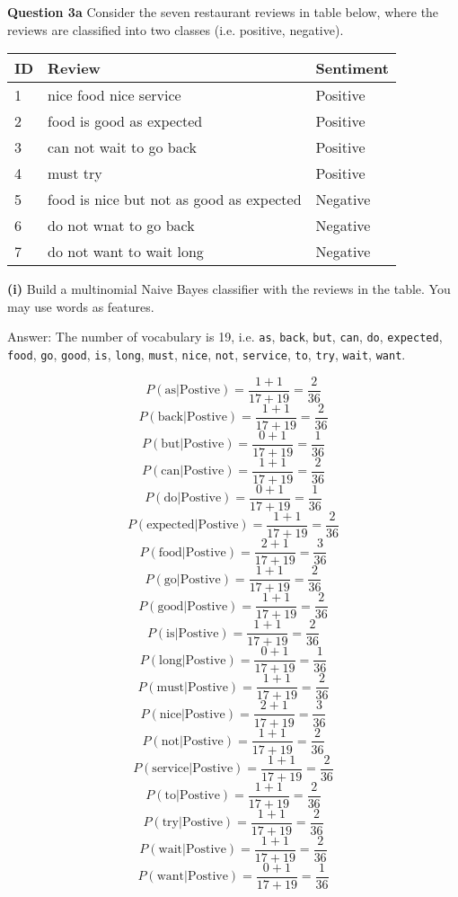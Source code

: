 \documentclass[11pt,a4paper]{report}
\begin{document}
\begin{multicols*}{2}
\noindent \textbf{Question 3a} Consider the seven restaurant reviews in table below, where the reviews are classified into two classes (i.e. positive, negative).

\begin{center}
\begin{tabular}{| l | p{5cm} | l |}
    \hline
    ID  & Review & Sentiment \\ \hline
    1   & nice food nice service & Positive \\
    2   & food is good as expected & Positive \\
    3   & can not wait to go back & Positive \\
    4   & must try & Positive \\
    5   & food is nice but not as good as expected & Negative \\
    6   & do not wnat to go back & Negative \\
    7   & do not want to wait long & Negative \\
    \hline
\end{tabular}
\end{center}

\noindent \textbf{(i)} Build a multinomial Naive Bayes classifier with the reviews in the table. You may use words as features. 

\noindent Answer: The number of vocabulary is 19, i.e. \verb|as|, \verb|back|, \verb|but|, \verb|can|, \verb|do|, \verb|expected|, \verb|food|, \verb|go|, \verb|good|, \verb|is|, \verb|long|, \verb|must|, \verb|nice|, \verb|not|, \verb|service|, \verb|to|, \verb|try|, \verb|wait|, \verb|want|. 

$$ P(\text{as} | \text{Postive} ) = \frac{1+ 1}{17 + 19} = \frac{2}{36}$$
$$ P(\text{back} | \text{Postive} ) = \frac{1+ 1}{17 + 19} = \frac{2}{36}$$
$$ P(\text{but} | \text{Postive} ) = \frac{0+ 1}{17 + 19} = \frac{1}{36}$$
$$ P(\text{can} | \text{Postive} ) = \frac{1+ 1}{17 + 19} = \frac{2}{36}$$
$$ P(\text{do} | \text{Postive} ) = \frac{0+ 1}{17 + 19} = \frac{1}{36}$$
$$ P(\text{expected} | \text{Postive} ) = \frac{1+ 1}{17 + 19} = \frac{2}{36}$$
$$ P(\text{food} | \text{Postive} ) = \frac{2+ 1}{17 + 19} = \frac{3}{36}$$
$$ P(\text{go} | \text{Postive} ) = \frac{1+ 1}{17 + 19} = \frac{2}{36}$$
$$ P(\text{good} | \text{Postive} ) = \frac{1+ 1}{17 + 19} = \frac{2}{36}$$
$$ P(\text{is} | \text{Postive} ) = \frac{1+ 1}{17 + 19} = \frac{2}{36}$$
$$ P(\text{long} | \text{Postive} ) = \frac{0+ 1}{17 + 19} = \frac{1}{36}$$
$$ P(\text{must} | \text{Postive} ) = \frac{1+ 1}{17 + 19} = \frac{2}{36}$$
$$ P(\text{nice} | \text{Postive} ) = \frac{2+ 1}{17 + 19} = \frac{3}{36}$$
$$ P(\text{not} | \text{Postive} ) = \frac{1+ 1}{17 + 19} = \frac{2}{36}$$
$$ P(\text{service} | \text{Postive} ) = \frac{1+ 1}{17 + 19} = \frac{2}{36}$$
$$ P(\text{to} | \text{Postive} ) = \frac{1+ 1}{17 + 19} = \frac{2}{36}$$
$$ P(\text{try} | \text{Postive} ) = \frac{1+ 1}{17 + 19} = \frac{2}{36}$$
$$ P(\text{wait} | \text{Postive} ) = \frac{1+ 1}{17 + 19} = \frac{2}{36}$$
$$ P(\text{want} | \text{Postive} ) = \frac{0+ 1}{17 + 19} = \frac{1}{36}$$


\end{multicols*}
\end{document}

